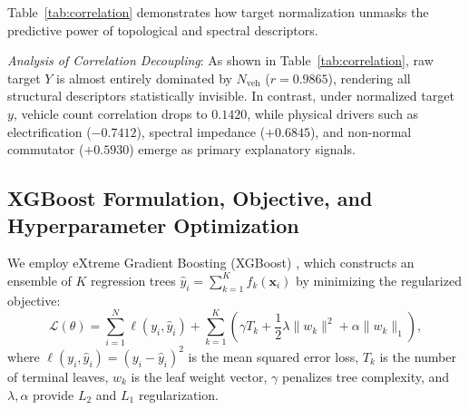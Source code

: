 \documentclass[journal]{IEEEtran}
\begin{document}
Table~\ref{tab:correlation} demonstrates how target normalization unmasks the predictive power of topological and spectral descriptors.

\begin{table}[htbp]
\caption{Statistical Correlation of Top Descriptors with Normalized ($y$) vs. Raw Total ($Y$) Emissions}
\label{tab:correlation}
\centering
{}
\end{table}

\textit{Analysis of Correlation Decoupling}:
As shown in Table~\ref{tab:correlation}, raw target $Y$ is almost entirely dominated by $N_{\text{veh}}$ ($r = 0.9865$), rendering all structural descriptors statistically invisible. In contrast, under normalized target $y$, vehicle count correlation drops to $0.1420$, while physical drivers such as electrification ($-0.7412$), spectral impedance ($+0.6845$), and non-normal commutator ($+0.5930$) emerge as primary explanatory signals.

\subsection{XGBoost Formulation, Objective, and Hyperparameter Optimization}
We employ eXtreme Gradient Boosting (XGBoost) \cite{Chen2016}, which constructs an ensemble of $K$ regression trees $\hat{y}_i = \sum_{k=1}^K f_k(\mathbf{x}_i)$ by minimizing the regularized objective:
\begin{equation}
\mathcal{L}(\theta) = \sum_{i=1}^N \ell(y_i, \hat{y}_i) + \sum_{k=1}^K \left( \gamma T_k + \frac{1}{2} \lambda \| w_k \|^2 + \alpha \| w_k \|_1 \right),
\label{eq:xgboost_obj}
\end{equation}
where $\ell(y_i, \hat{y}_i) = (y_i - \hat{y}_i)^2$ is the mean squared error loss, $T_k$ is the number of terminal leaves, $w_k$ is the leaf weight vector, $\gamma$ penalizes tree complexity, and $\lambda, \alpha$ provide $L_2$ and $L_1$ regularization.
\end{document}
